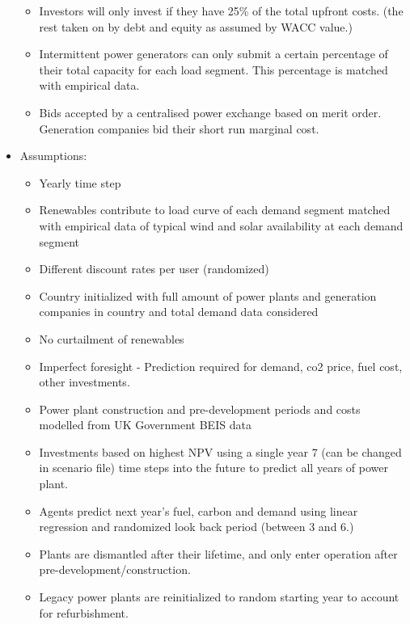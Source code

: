 \begin{itemize}
\begin{itemize}
		\item Investors will only invest if they have 25\% of the total upfront costs. (the rest taken on by debt and equity as assumed by WACC value.)
		\item Intermittent power generators can only submit a certain percentage of their total capacity for each load segment. This percentage is matched with empirical data.
		\item Bids accepted by a centralised power exchange based on merit order. Generation companies bid their short run marginal cost.
	\end{itemize}
	\item Assumptions: 
	\begin{itemize}
		\item Yearly time step
		\item Renewables contribute to load curve of each demand segment matched with empirical data of typical wind and solar availability at each demand segment
		\item Different discount rates per user (randomized)
		\item Country initialized with full amount of power plants and generation companies in country and total demand data considered
		\item No curtailment of renewables
		\item Imperfect foresight - Prediction required for demand, co2 price, fuel cost, other investments.
		\item Power plant construction and pre-development periods and costs modelled from UK Government BEIS data
		\item Investments based on highest NPV using a single year 7 (can be changed in scenario file) time steps into the future to predict all years of power plant.
		\item Agents predict next year's fuel, carbon and demand using linear regression and randomized look back period (between 3 and 6.)
		\item Plants are dismantled after their lifetime, and only enter operation after pre-development/construction.
		\item Legacy power plants are reinitialized to random starting year to account for refurbishment.
		\end{itemize}
\end{itemize}